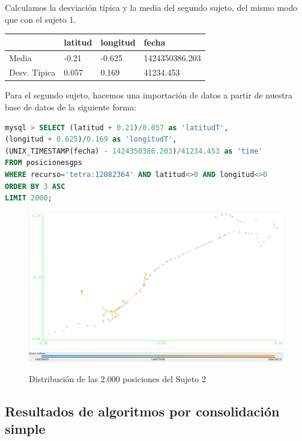 \documentclass[a4paper, 12pt, spanish]{article}
\begin{document}
Calculamos la desviaci\'on t\'ipica y la media del segundo sujeto, del mismo modo que con el sujeto 1.\\

	\begin{tabular}{l|l|l|l}
	\rowcolor{LightCyan}
		& latitud & longitud & fecha\\
	\hline
		Media & -0.21 & -0.625 & 1424350386.203 \\
		Desv. T\'ipica & 0.057 & 0.169 & 41234.453 \\
	\end{tabular}

	
	\bigskip

Para el segundo sujeto, hacemos una importaci\'on de datos a partir de nuestra base de datos de la siguiente forma:\\

\begin{lstlisting}[language=sql, columns=fullflexible, basicstyle=\small, frame=tblr]
mysql > SELECT (latitud + 0.21)/0.057 as 'latitudT', 
(longitud + 0.625)/0.169 as 'longitudT', 
(UNIX_TIMESTAMP(fecha) - 1424350386.203)/41234.453 as 'time'
FROM posicionesgps
WHERE recurso='tetra:12082364' AND latitud<>0 AND longitud<>0
ORDER BY 3 ASC
LIMIT 2000;
\end{lstlisting}

\begin{figure}[H]
	\includegraphics[scale=.5]{../comparativa/sujeto2.png}
	\includegraphics[scale=.4]{../comparativa/leyenda.png}
	\caption{Distribuci\'on de las 2.000 posiciones del Sujeto 2}
\end{figure}

\subsection{Resultados de algoritmos por consolidaci\'on simple}
\end{document}
